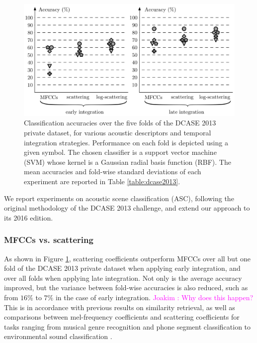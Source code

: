 \documentclass[journal]{IEEEtran}
\makeatletter
\newcommand*{\vs}{vs.\@\xspace}
\newcommand{\ja}[1]{\textcolor{magenta}{Joakim : #1}}
\makeatother
\begin{document}
\begin{figure}
\begin{center}
\includegraphics[width=\columnwidth]{bw/folds.png}
\caption{\label{fig:folds}
Classification accuracies over the five folds of the DCASE 2013 private dataset, for various acoustic descriptors and temporal integration strategies.  Performance on each fold is depicted using a given symbol.
The chosen classifier is a support vector machine (SVM) whose kernel is a Gaussian radial basis function (RBF).
The mean accuracies and fold-wise standard deviations of each experiment are reported in Table \ref{table:dcase2013}.}
\end{center}
\end{figure}


We report experiments on acoustic scene classification (ASC), following the original methodology of the DCASE 2013 challenge, and extend our approach to its 2016 edition.

\subsubsection*{MFCCs \vs scattering}

As shown in Figure \ref{fig:folds}, scattering coefficients outperform MFCCs over all but one fold of the DCASE 2013 private dataset when applying early integration, and over all folds when applying late integration.
Not only is the average accuracy improved, but the variance between fold-wise accuracies is also reduced, such as from $16\%$ to $7\%$ in the case of early integration. \ja{Why does this happen?}
This is in accordance with previous results on similarity retrieval, as well as comparisons between mel-frequency coefficients and scattering coefficients for tasks ranging from musical genre recognition and phone segment classification \cite{Anden2014} to environmental sound classification \cite{Salamon2015}.
\end{document}
